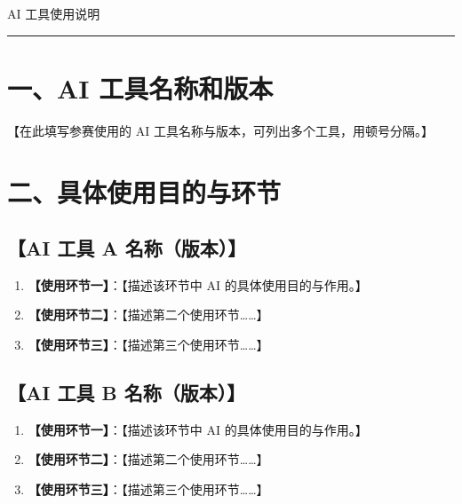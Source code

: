 \documentclass[a4paper,12pt]{article}
\begin{document}
\begin{center}
    {\heiti AI 工具使用说明}
\end{center}
\vspace{0.5em}

\noindent\rule{\linewidth}{0.8pt}
\vspace{0.8em}

\section*{一、AI 工具名称和版本}
\noindent
【在此填写参赛使用的 AI 工具名称与版本，可列出多个工具，用顿号分隔。】


\section*{二、具体使用目的与环节}

\subsection*{\textbf{【AI 工具 A 名称（版本）】}}
\begin{enumerate}[label=(\arabic*)]
    \item \textbf{【使用环节一】}：【描述该环节中 AI 的具体使用目的与作用。】
    \item \textbf{【使用环节二】}：【描述第二个使用环节……】
    \item \textbf{【使用环节三】}：【描述第三个使用环节……】
\end{enumerate}

\subsection*{\textbf{【AI 工具 B 名称（版本）】}}
\begin{enumerate}[label=(\arabic*)]
    \item \textbf{【使用环节一】}：【描述该环节中 AI 的具体使用目的与作用。】
    \item \textbf{【使用环节二】}：【描述第二个使用环节……】
    \item \textbf{【使用环节三】}：【描述第三个使用环节……】
\end{enumerate}
\end{document}
